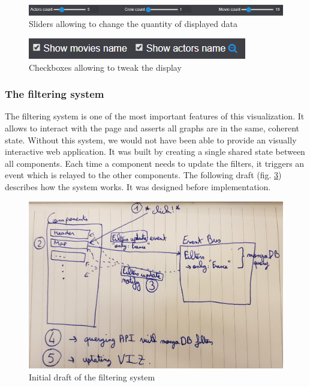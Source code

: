 \documentclass[a4paper,10pt]{article}
\begin{document}
\begin{figure}[ht]
  \centering
  \includegraphics[height=0.04\linewidth]{images/screens/network-movies-sliders.png}
  \caption{Sliders allowing to change the quantity of displayed data} \label{fig:screen-network-movies-sliders}
\end{figure}

\begin{figure}[ht]
  \centering
  \includegraphics[height=0.04\linewidth]{images/screens/network-movies-checkboxes.png}
  \caption{Checkboxes allowing to tweak the display} \label{fig:screen-network-movies-checkboxes}
\end{figure}

\subsubsection{The filtering system} \label{sec:filtering-system}

The filtering system is one of the most important features of this visualization.
It allows to interact with the page and asserts all graphs are in the same, coherent
state. Without this system, we would not have been able to provide an visually interactive web application.
It was built by creating a single shared state between all components. Each
time a component needs to update the filters, it triggers an event which is relayed
to the other components. The following draft (fig. \ref{fig:draft-filtering}) describes how the system works. It
was designed before implementation.

\begin{figure}[ht]
   \centering
   \includegraphics[width=0.6\linewidth]{images/drafts/filtering-system.jpg}
  \caption{Initial draft of the filtering system} \label{fig:draft-filtering}
\end{figure}
\end{document}
